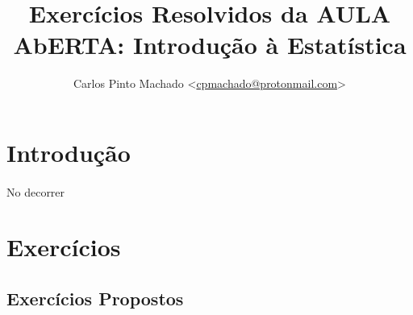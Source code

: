 \documentclass[11pt,a4paper]{article}
\author{Carlos Pinto Machado
	<\href{mailto:cpmachado@protonmail.com}{cpmachado@protonmail.com}>}
\title{Exercícios Resolvidos da AULA AbERTA: Introdução à Estatística}
\begin{document}
\maketitle
\tableofcontents

\clearpage

\section*{Introdução}

\paragraph{} No decorrer \cite{OliveiraAulaAberta2017}

\clearpage
\setcounter{section}{3}
\section{Exercícios}
\subsection*{Exercícios Propostos}
\end{document}

